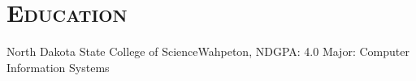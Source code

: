 \documentclass[11pt,letter,roman]{moderncv}
\begin{document}

\section{\textsc{Education}}
\label{sec:Education}
{North Dakota State College of Science}{Wahpeton, ND}{GPA: 4.0}
{Major: Computer Information Systems}
\end{document}
